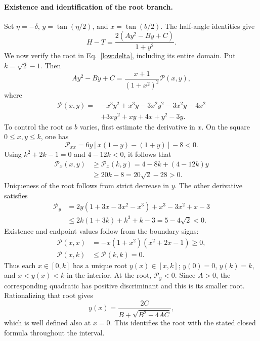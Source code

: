 \paragraph{Existence and identification of the root branch.}
Set $\eta=-\delta$, $y=\tan(\eta/2)$, and $x=\tan(b/2)$. The half-angle identities give
\begin{equation}
 H-T=\frac{2(Ay^2-By+C)}{1+y^2}.
 \label{low:quadratic-identity}
\end{equation}
We now verify the root in Eq.~\eqref{low:delta}, including its entire
domain.  Put $k=\sqrt2-1$.  Then
\begin{equation}
 Ay^2-By+C=\frac{x+1}{(1+x^2)^2}\mathcal P(x,y),
 \label{low:halfangle-polynomial}
\end{equation}
where
\begin{align}
 \mathcal P(x,y)={}&-x^3y^2+x^3y-3x^2y^2-3x^2y-4x^2\nonumber\\
 &+3xy^2+xy+4x+y^2-3y.
 \label{low:polynomial}
\end{align}
To control the root as $b$ varies, first estimate the derivative in $x$. On the square $0\le x,y\le k$, one has
\begin{equation}
 \mathcal P_{xx}=6y[x(1-y)-(1+y)]-8<0.
\end{equation}
Using $k^2+2k-1=0$ and $4-12k<0$, it follows that
\begin{align}
 \mathcal P_x(x,y)&\ge \mathcal P_x(k,y)
 =4-8k+(4-12k)y\nonumber\\
 &\ge20k-8=20\sqrt2-28>0.
 \label{low:fx-positive}
\end{align}
Uniqueness of the root follows from strict decrease in $y$. The other derivative satisfies
\begin{align}
 \mathcal P_y&=2y(1+3x-3x^2-x^3)+x^3-3x^2+x-3\nonumber\\
 &\le2k(1+3k)+k^3+k-3
 =5-4\sqrt2<0.
 \label{low:fz-negative}
\end{align}
Existence and endpoint values follow from the boundary signs:
\begin{align}
 \mathcal P(x,x)&=-x(1+x^2)(x^2+2x-1)\ge0,\nonumber\\
 \mathcal P(x,k)&\le \mathcal P(k,k)=0.
 \label{low:boundary}
\end{align}
Thus each $x\in[0,k]$ has a unique root $y(x)\in[x,k]$;
$y(0)=0$, $y(k)=k$, and $x<y(x)<k$ in the interior.
At the root, $\mathcal P_y<0$.  Since $A>0$, the corresponding quadratic has
positive discriminant and this is its smaller root.  Rationalizing that
root gives
\begin{equation}
 y(x)=\frac{2C}{B+\sqrt{B^2-4AC}},
 \label{low:root-identified}
\end{equation}
which is well defined also at $x=0$.  This identifies the root with the stated closed formula throughout the interval.

